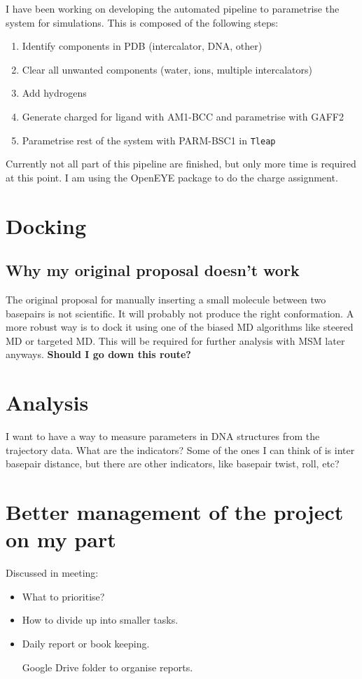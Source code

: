 \documentclass{article}
\begin{document}
I have been working on developing the automated pipeline to parametrise the system for simulations. This is composed of the following steps:

\begin{enumerate}
  \item Identify components in PDB (intercalator, DNA, other)
  \item Clear all unwanted components (water, ions, multiple intercalators)
  \item Add hydrogens
  \item Generate charged for ligand with AM1-BCC and parametrise with GAFF2
  \item Parametrise rest of the system with PARM-BSC1 in \texttt{Tleap}
\end{enumerate}

Currently not all part of this pipeline are finished, but only more time is required at this point. I am using the OpenEYE package to do the charge assignment.

\section{Docking}

\subsection{Why my original proposal doesn't work}

The original proposal for manually inserting a small molecule between two basepairs is not scientific. It will probably not produce the right conformation. A more robust way is to dock it using one of the biased MD algorithms like steered MD or targeted MD. This will be required for further analysis with MSM later anyways. \textbf{Should I go down this route?}

\section{Analysis}

I want to have a way to measure parameters in DNA structures from the trajectory data. What are the indicators? Some of the ones I can think of is inter basepair distance, but there are other indicators, like basepair twist, roll, etc?

\section{Better management of the project on my part}

Discussed in meeting:

\begin{itemize}
  \item What to prioritise?
  \item How to divide up into smaller tasks.
  \item Daily report or book keeping.

  Google Drive folder to organise reports.
\end{itemize}
\end{document}
